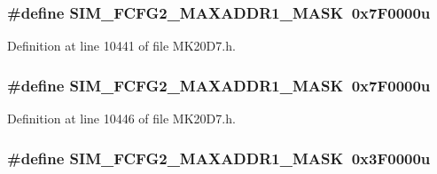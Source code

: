 \subsubsection[{\texorpdfstring{S\+I\+M\+\_\+\+F\+C\+F\+G2\+\_\+\+M\+A\+X\+A\+D\+D\+R1\+\_\+\+M\+A\+SK}{SIM_FCFG2_MAXADDR1_MASK}}]{\setlength{\rightskip}{0pt plus 5cm}\#define S\+I\+M\+\_\+\+F\+C\+F\+G2\+\_\+\+M\+A\+X\+A\+D\+D\+R1\+\_\+\+M\+A\+SK~0x7\+F0000u}\hypertarget{group___s_i_m___register___masks_ga4a9efde69ef5ab882d94b4ff6f659493}{}\label{group___s_i_m___register___masks_ga4a9efde69ef5ab882d94b4ff6f659493}


Definition at line 10441 of file M\+K20\+D7.\+h.

\subsubsection[{\texorpdfstring{S\+I\+M\+\_\+\+F\+C\+F\+G2\+\_\+\+M\+A\+X\+A\+D\+D\+R1\+\_\+\+M\+A\+SK}{SIM_FCFG2_MAXADDR1_MASK}}]{\setlength{\rightskip}{0pt plus 5cm}\#define S\+I\+M\+\_\+\+F\+C\+F\+G2\+\_\+\+M\+A\+X\+A\+D\+D\+R1\+\_\+\+M\+A\+SK~0x7\+F0000u}\hypertarget{group___s_i_m___register___masks_ga4a9efde69ef5ab882d94b4ff6f659493}{}\label{group___s_i_m___register___masks_ga4a9efde69ef5ab882d94b4ff6f659493}


Definition at line 10446 of file M\+K20\+D7.\+h.

\subsubsection[{\texorpdfstring{S\+I\+M\+\_\+\+F\+C\+F\+G2\+\_\+\+M\+A\+X\+A\+D\+D\+R1\+\_\+\+M\+A\+SK}{SIM_FCFG2_MAXADDR1_MASK}}]{\setlength{\rightskip}{0pt plus 5cm}\#define S\+I\+M\+\_\+\+F\+C\+F\+G2\+\_\+\+M\+A\+X\+A\+D\+D\+R1\+\_\+\+M\+A\+SK~0x3\+F0000u}\hypertarget{group___s_i_m___register___masks_ga4a9efde69ef5ab882d94b4ff6f659493}{}\label{group___s_i_m___register___masks_ga4a9efde69ef5ab882d94b4ff6f659493}


